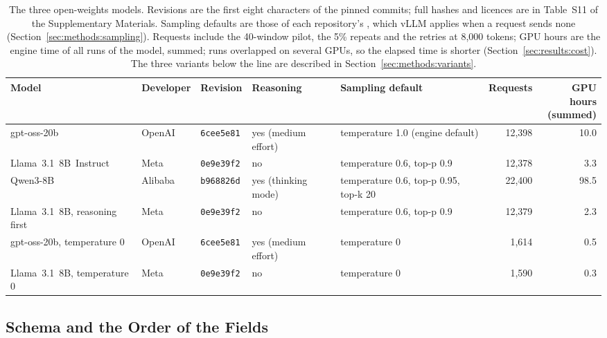 \begin{table}[!t]
\centering
\caption{The three open-weights models. Revisions are the first eight characters of the pinned commits; full hashes and licences are in Table~S11 of the Supplementary Materials. Sampling defaults are those of each repository's , which vLLM applies when a request sends none (Section~\ref{sec:methods:sampling}). Requests include the 40-window pilot, the 5\% repeats and the retries at 8{,}000 tokens; GPU hours are the engine time of all runs of the model, summed; runs overlapped on several GPUs, so the elapsed time is shorter (Section~\ref{sec:results:cost}). The three variants below the line are described in Section~\ref{sec:methods:variants}.}
\label{tab:models}
\footnotesize
\setlength{\tabcolsep}{3pt}
\begin{tabularx}{\textwidth}{@{}XlllXrr@{}}
\toprule
Model & Developer & Revision & Reasoning & Sampling default & Requests & \shortstack[r]{GPU hours\\(summed)} \\
\midrule
gpt-oss-20b & OpenAI & \texttt{6cee5e81} & yes (medium effort) & temperature 1.0 (engine default) & 12{,}398 & 10.0 \\
Llama~3.1~8B~Instruct & Meta & \texttt{0e9e39f2} & no & temperature 0.6, top-p 0.9 & 12{,}378 & 3.3 \\
Qwen3-8B & Alibaba & \texttt{b968826d} & yes (thinking mode) & temperature 0.6, top-p 0.95, top-k 20 & 22{,}400 & 98.5 \\
\midrule
Llama~3.1~8B, reasoning first & Meta & \texttt{0e9e39f2} & no & temperature 0.6, top-p 0.9 & 12{,}379 & 2.3 \\
gpt-oss-20b, temperature 0 & OpenAI & \texttt{6cee5e81} & yes (medium effort) & temperature 0 & 1{,}614 & 0.5 \\
Llama~3.1~8B, temperature 0 & Meta & \texttt{0e9e39f2} & no & temperature 0 & 1{,}590 & 0.3 \\
\bottomrule
\end{tabularx}
\end{table}

\subsection{Schema and the Order of the Fields}
\label{sec:methods:schema}

